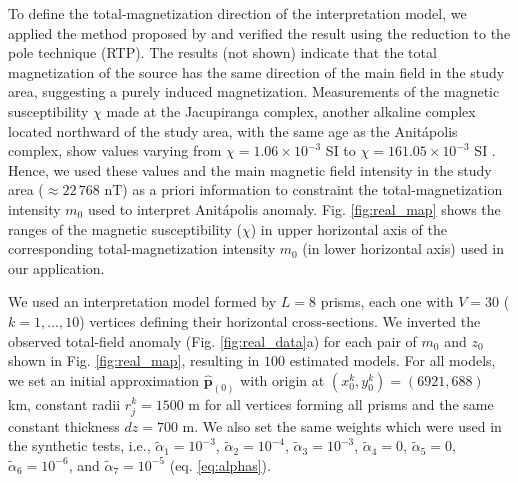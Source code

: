 To define the total-magnetization direction of the interpretation model, 
we applied the method proposed by \citet{oliveirajr-etal2015} and verified the 
result using the reduction to the pole technique (RTP). The results (not shown) 
indicate that the total magnetization of the source has the same direction of the 
main field in the study area, suggesting a purely induced magnetization.
Measurements of the magnetic susceptibility $\chi$ made at the Jacupiranga complex,
another alkaline complex located northward of the study area, 
with the same age as the Anit{\'a}polis complex, 
show values varying from $\chi = 1.06 \times 10^{-3}$ SI to 
$\chi = 161.05 \times 10^{-3}$ SI \citep[][ tb. 1]{valdivia-2009}.
Hence, we used these values and the main magnetic field intensity in the study area 
($\approx 22 \, 768 $ nT) as a priori information to constraint the 
total-magnetization intensity $m_{0}$ used to interpret Anit{\'a}polis anomaly.
Fig. \ref{fig:real_map} shows the ranges of the magnetic susceptibility ($ \chi $) in upper horizontal axis of the corresponding total-magnetization 
intensity $m_{0}$ (in lower horizontal axis) used in our application.

We used an interpretation model formed by $L = 8$ prisms, each one with 
$V = 30$ ($k = 1, \dots , 10$) vertices defining their horizontal cross-sections.
We inverted the observed total-field anomaly (Fig. \ref{fig:real_data}a) for each 
pair of $m_0$ and $z_0$ shown in Fig. \ref{fig:real_map}, resulting in $100$ estimated 
models. 
For all models, we set an initial approximation $\hat{\mathbf{p}}_{(0)}$ with origin 
at $(x_0^k, y_0^k) = (6921, 688)$ km, constant radii $r_j^k = 1500$ m for 
all vertices forming all prisms and the same constant thickness $dz = 700$ m.
We also set the same weights which were used in the synthetic tests, i.e., $\tilde{\alpha}_1 = 10^{-3}$, 
$\tilde{\alpha}_2 = 10^{-4}$, 
$\tilde{\alpha}_3 = 10^{-3}$, $\tilde{\alpha}_4 = 0$, $\tilde{\alpha}_5 = 0$, 
$\tilde{\alpha}_6 = 10^{-6}$, and $\tilde{\alpha}_7 = 10^{-5}$ (eq. \ref{eq:alphas}). 

